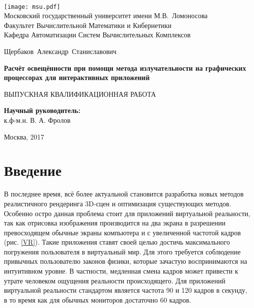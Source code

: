 \documentclass[12pt,fleqn]{article}
\begin{document}
\begin{titlepage}
\begin{center}
\ \vspace{-2cm}

    \texttt{[image: msu.pdf]}\\
    {Московский государственный университет имени М.В.~Ломоносова}\\
    Факультет Вычислительной Математики и Кибернетики\\
    Кафедра Автоматизации Систем Вычислительных Комплексов
    
    \vspace{3cm}

    {\Large Щербаков~Александр~Станиславович}

	\vspace{1cm}    
    
    {\Large\bfseries Расчёт освещённости при помощи метода излучательности на графических процессорах для интерактивных приложений\\}

	\vspace{1cm}

    {\large ВЫПУСКНАЯ КВАЛИФИКАЦИОННАЯ РАБОТА}

\end{center}

\vfill

    \begin{flushright}
            \textbf{Научный руководитель:}\\
            к.ф-м.н. В. А. Фролов
    \end{flushright}

\vfill

\begin{center}
    Москва, 2017
\end{center}

\end{titlepage}

\newpage
\renewcommand{\contentsname}{Содержание}
\tableofcontents

\newpage
\section{Введение}

В последнее время, всё более актуальной становится разработка новых методов реалистичного рендеринга 3D-сцен и оптимизация существующих методов. Особенно остро данная проблема стоит для приложений виртуальной реальности, так как отрисовка изображения производится на два экрана в разрешении превосходящем обычные экраны компьютера и с увеличенной частотой кадров (рис. \ref{VR}). Такие приложения ставят своей целью достичь максимального погружения пользователя в виртуальный мир. Для этого требуется соблюдение привычных пользователю законов физики, которые зачастую воспринимаются на интуитивном уровне. В частности, медленная смена кадров может привести к утрате человеком ощущения реальности происходящего. Для приложений виртуальной реальности стандартом является частота 90 и 120 кадров в секунду, в то время как для обычных мониторов достаточно 60 кадров.
\end{document}
